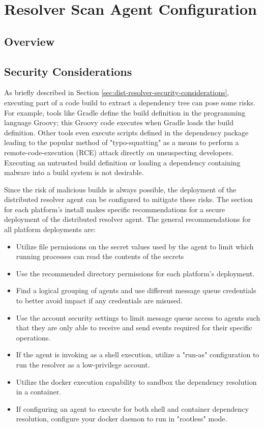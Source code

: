 \section{Resolver Scan Agent Configuration}\label{sec:resolver-agent}

\subsection{Overview}


\subsection{Security Considerations}\label{sec:resolver-agent-security}

As briefly described in Section \ref{sec:dist-resolver-security-considerations}, executing
part of a code build to extract a dependency tree can pose some risks. For example,
tools like Gradle define the build definition in the programming language Groovy; this Groovy
code executes when Gradle loads the build definition.  Other tools even execute scripts defined
in the dependency package leading to the popular method of "typo-squatting" as a means to
perform a remote-code-execution (RCE) attack directly on unsuspecting developers.  Executing an
untrusted build definition or loading a dependency containing malware into a build system is
not desirable.

Since the risk of malicious builds is always possible, the deployment of the distributed resolver agent
can be configured to mitigate these risks.  The section for each platform's install makes specific
recommendations for a secure deployment of the distributed resolver agent.  The general recommendations
for all platform deployments are:

\begin{itemize}
  \item Utilize file permissions on the secret values used by the agent to limit which running processes
    can read the contents of the secrets
  \item Use the recommended directory permissions for each platform's deployment.
  \item Find a logical grouping of agents and use different message queue credentials to better avoid
    impact if any credentials are misused.
  \item Use the account security settings to limit message queue access to agents such that they are only
    able to receive and send events required for their specific operations.
  \item If the agent is invoking \scaresolver as a shell execution, utilize a "run-as" configuration to
    run the resolver as a low-privilege account.
  \item Utilize the \scaresolver docker execution capability to sandbox the dependency resolution in a container.
  \item If configuring an agent to execute \scaresolver for both shell and container dependency resolution,
    configure your docker daemon to run in "rootless" mode.
\end{itemize}



